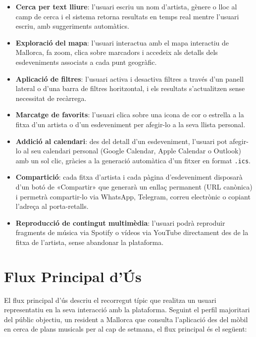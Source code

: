 \begin{itemize}
    \item \textbf{Cerca per text lliure}: l'usuari escriu un nom d'artista, gènere o lloc al camp de cerca i el sistema retorna resultats en temps real mentre l'usuari escriu, amb suggeriments automàtics.
    \item \textbf{Exploració del mapa}: l'usuari interactua amb el mapa interactiu de Mallorca, fa zoom, clica sobre marcadors i accedeix als detalls dels esdeveniments associats a cada punt geogràfic.
    \item \textbf{Aplicació de filtres}: l'usuari activa i desactiva filtres a través d'un panell lateral o d'una barra de filtres horitzontal, i els resultats s'actualitzen sense necessitat de recàrrega.
    \item \textbf{Marcatge de favorits}: l'usuari clica sobre una icona de cor o estrella a la fitxa d'un artista o d'un esdeveniment per afegir-lo a la seva llista personal.
    \item \textbf{Addició al calendari}: des del detall d'un esdeveniment, l'usuari pot afegir-lo al seu calendari personal (Google Calendar, Apple Calendar o Outlook) amb un sol clic, gràcies a la generació automàtica d'un fitxer en format \texttt{.ics}.
    \item \textbf{Compartició}: cada fitxa d'artista i cada pàgina d'esdeveniment disposarà d'un botó de «Compartir» que generarà un enllaç permanent (URL canònica) i permetrà compartir-lo via WhatsApp, Telegram, correu electrònic o copiant l'adreça al porta-retalls.
    \item \textbf{Reproducció de contingut multimèdia}: l'usuari podrà reproduir fragments de música via Spotify o vídeos via YouTube directament des de la fitxa de l'artista, sense abandonar la plataforma.
\end{itemize}

\section{Flux Principal d'Ús}

El flux principal d'ús descriu el recorregut típic que realitza un usuari representatiu en la seva interacció amb la plataforma. Seguint el perfil majoritari del públic objectiu, un resident a Mallorca que consulta l'aplicació des del mòbil en cerca de plans musicals per al cap de setmana, el flux principal és el següent:


